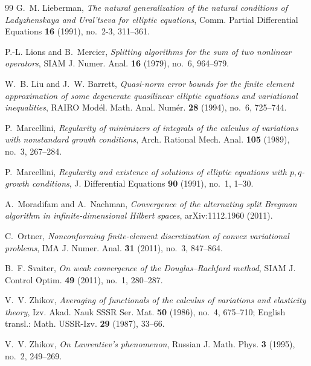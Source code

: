 \documentclass[11pt]{amsart}
\theoremstyle{definition}
\theoremstyle{remark}
\numberwithin{equation}{section}
\begin{document}
\begin{thebibliography}{99}
G.~M. Lieberman, \emph{The natural generalization of the natural conditions of Ladyzhenskaya and Ural'tseva for elliptic equations}, Comm. Partial Differential Equations \textbf{16} (1991), no.~2-3, 311--361.

P.-L. Lions and B.~Mercier, \emph{Splitting algorithms for the sum of two nonlinear operators}, SIAM J. Numer. Anal. \textbf{16} (1979), no.~6, 964--979.

W.~B. Liu and J.~W. Barrett, \emph{Quasi-norm error bounds for the finite element approximation of some degenerate quasilinear elliptic equations and variational inequalities}, RAIRO Mod\'el. Math. Anal. Num\'er. \textbf{28} (1994), no.~6, 725--744.

P.~Marcellini, \emph{Regularity of minimizers of integrals of the calculus of variations with nonstandard growth conditions}, Arch. Rational Mech. Anal. \textbf{105} (1989), no.~3, 267--284.

P.~Marcellini, \emph{Regularity and existence of solutions of elliptic equations with $p,q$-growth conditions}, J. Differential Equations \textbf{90} (1991), no.~1, 1--30.

A.~Moradifam and A.~Nachman, \emph{Convergence of the alternating split Bregman algorithm in infinite-dimensional Hilbert spaces}, arXiv:1112.1960 (2011).

C.~Ortner, \emph{Nonconforming finite-element discretization of convex variational problems}, IMA J. Numer. Anal. \textbf{31} (2011), no.~3, 847--864.

B.~F. Svaiter, \emph{On weak convergence of the Douglas--Rachford method}, SIAM J. Control Optim. \textbf{49} (2011), no.~1, 280--287.

V.~V. Zhikov, \emph{Averaging of functionals of the calculus of variations and elasticity theory}, Izv. Akad. Nauk SSSR Ser. Mat. \textbf{50} (1986), no.~4, 675--710; English transl.: Math. USSR-Izv. \textbf{29} (1987), 33--66.

V.~V. Zhikov, \emph{On Lavrentiev's phenomenon}, Russian J. Math. Phys. \textbf{3} (1995), no.~2, 249--269.

\end{thebibliography}
\end{document}
